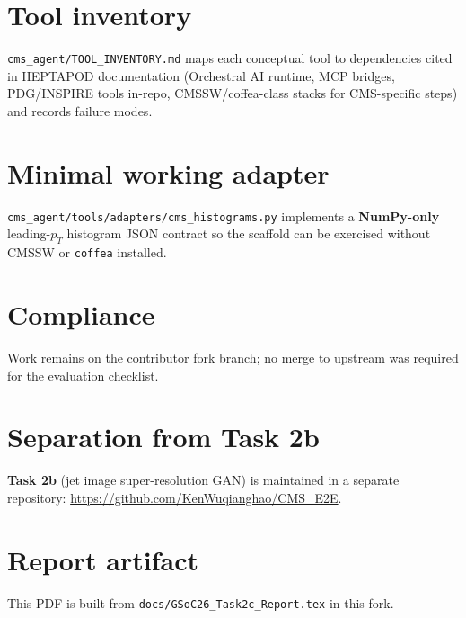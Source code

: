 \documentclass[11pt,a4paper]{article}
\begin{document}
\section{Tool inventory}
\texttt{cms\_agent/TOOL\_INVENTORY.md} maps each conceptual tool to dependencies cited in HEPTAPOD documentation (Orchestral AI runtime, MCP bridges, PDG/INSPIRE tools in-repo, CMSSW/coffea-class stacks for CMS-specific steps) and records failure modes.

\section{Minimal working adapter}
\texttt{cms\_agent/tools/adapters/cms\_histograms.py} implements a \textbf{NumPy-only} leading-\(p_T\) histogram JSON contract so the scaffold can be exercised without CMSSW or \texttt{coffea} installed.

\section{Compliance}
Work remains on the contributor fork branch; no merge to upstream was required for the evaluation checklist.

\section*{Separation from Task 2b}
\textbf{Task 2b} (jet image super-resolution GAN) is maintained in a separate repository: \url{https://github.com/KenWuqianghao/CMS\_E2E}.

\section*{Report artifact}
This PDF is built from \texttt{docs/GSoC26\_Task2c\_Report.tex} in this fork.
\end{document}
